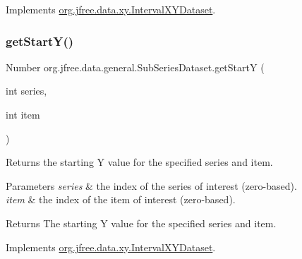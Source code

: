 Implements \mbox{\hyperlink{interfaceorg_1_1jfree_1_1data_1_1xy_1_1_interval_x_y_dataset_a7548ec7d60d72463313dc6f10aceee62}{org.\+jfree.\+data.\+xy.\+Interval\+X\+Y\+Dataset}}.

\mbox{\label{classorg_1_1jfree_1_1data_1_1general_1_1_sub_series_dataset_a052aebbd647cedf1958cbac4b198eb7a}} 
\subsubsection{\texorpdfstring{get\+Start\+Y()}{getStartY()}}
{\footnotesize\ttfamily Number org.\+jfree.\+data.\+general.\+Sub\+Series\+Dataset.\+get\+StartY (\begin{DoxyParamCaption}\item[{int}]{series,  }\item[{int}]{item }\end{DoxyParamCaption})}

Returns the starting Y value for the specified series and item.


\begin{DoxyParams}{Parameters}
{\em series} & the index of the series of interest (zero-\/based). \\
\hline
{\em item} & the index of the item of interest (zero-\/based).\\
\hline
\end{DoxyParams}
\begin{DoxyReturn}{Returns}
The starting Y value for the specified series and item. 
\end{DoxyReturn}


Implements \mbox{\hyperlink{interfaceorg_1_1jfree_1_1data_1_1xy_1_1_interval_x_y_dataset_afdd414735adb233734bc35b76a005ed9}{org.\+jfree.\+data.\+xy.\+Interval\+X\+Y\+Dataset}}.

\mbox{\label{classorg_1_1jfree_1_1data_1_1general_1_1_sub_series_dataset_aadeb99143b984112ba4fa142d0c0a931}} 
